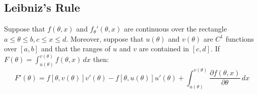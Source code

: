 \subsection{Leibniz's Rule}

\begin{theorem}
    Suppose that $f(\theta, x)$ and $f_{\theta}'(\theta,x)$ are continuous over the rectangle $a \leq \theta \leq b, c \leq x \leq d$. Moreover, suppose that $u(\theta)$ and $v(\theta)$ are $C^1$ functions over $[a,b]$ and that the ranges of $u$ and $v$ are contained in $[c,d]$. If $F(\theta) = \int_{u(\theta)}^{v(\theta)} f(\theta, x) \, dx$ then:
    \begin{equation*}
        F'(\theta) = f[\theta, v(\theta)]v'(\theta) - f[\theta, u(\theta)]u'(\theta) + \int_{u(\theta)}^{v(\theta)} \frac{\partial f(\theta, x)}{\partial \theta} \, dx
    \end{equation*}
\end{theorem}

